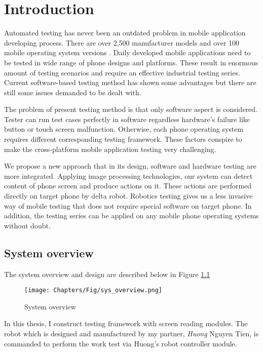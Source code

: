 \chapter{Introduction}

Automated testing has never been an outdated problem in mobile application developing process. There are over 2,500 manufacturer models and over 100 mobile operating system versions \cite{crittercism}. Daily developed mobile applications need to be tested in wide range of phone designs and platforms. These result in enormous amount of testing scenarios and require an effective industrial testing series. Current software-based testing method has shown some advantages but there are still some issues demanded to be dealt with.

The problem of present testing method is that only software aspect is considered. Tester can run test cases perfectly in software regardless hardware's failure like button or touch screen malfunction. Otherwise, each phone operating system requires different corresponding testing framework. These factors conspire to make the cross-platform mobile application testing very challenging. \nocite{weinman_thesis}

We propose a new approach that in its design, software and hardware testing are more integrated. Applying image processing technologies, our system can detect content of phone screen and produce actions on it. These actions are performed directly on target phone by delta robot. Robotics testing gives us a less invasive way of mobile testing that does not require special software on target phone. In addition, the testing series can be applied on any mobile phone operating systems without doubt.

\section{System overview}
The system overview and design are described below in Figure \ref{fig:sys_overview}
	\begin{figure}
		\centering
		\texttt{[image: Chapters/Fig/sys\_overview.png]}
		\caption{System overview}
		\label{fig:sys_overview}
	\end{figure}

In this thesis, I construct testing framework with screen reading modules. The robot which is designed and manufactured by my partner, \textit{Huong} Nguyen Tien, is commanded to perform the work test via Huong's robot controller module.

